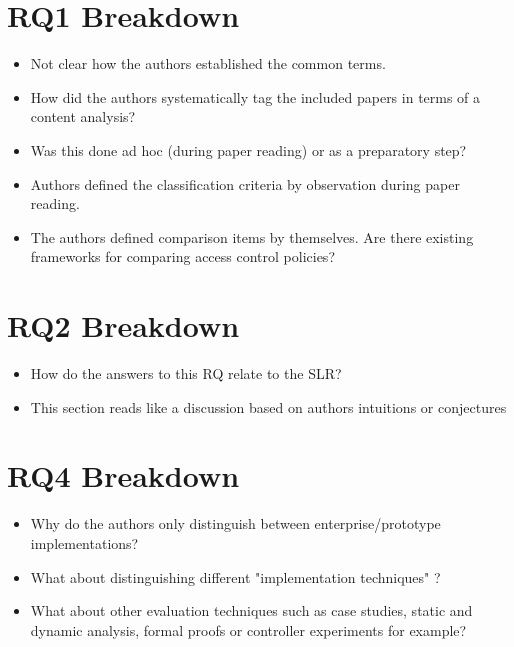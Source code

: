 \section{RQ1 Breakdown}

\begin{itemize}

\item Not clear how the authors established the common terms.

\item How did the authors systematically tag the included papers in terms of a content analysis?

\item Was this done ad hoc (during paper reading) or as a preparatory step?

\item Authors defined the classification criteria by observation during paper reading.

\item The authors defined comparison items by themselves. Are there existing frameworks for comparing access control policies?

\end{itemize}


\section{RQ2 Breakdown}

\begin{itemize}

\item How do the answers to this RQ relate to the SLR?

\item This section reads like a discussion based on authors intuitions or conjectures

\end{itemize}


\section{RQ4 Breakdown}

\begin{itemize}

\item Why do the authors only distinguish between enterprise/prototype implementations?

\item What about distinguishing different "implementation techniques" ?

\item What about other evaluation techniques such as case studies, static and dynamic analysis, formal proofs or controller experiments for example?

\end{itemize}



